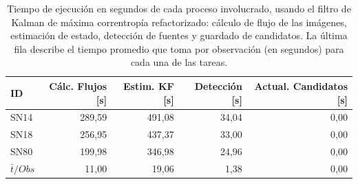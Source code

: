 \begin{table}[h!]
\centering
\caption{Tiempo de ejecuci\'on en segundos de cada proceso involucrado, usando el filtro de Kalman de m\'axima correntrop\'ia refactorizado: c\'alculo de flujo de las im\'agenes, estimaci\'on de estado, detecci\'on de fuentes y guardado de candidatos. La \'ultima fila describe el tiempo promedio que toma por observaci\'on (en segundos) para cada una de las tareas.}
\begin{tabular}{|l|r|r|r|r|}
\hline
\textbf{ID} & \textbf{C\'alc. Flujos [s]} & \textbf{Estim. KF [s]} &  \textbf{Detecci\'on [s]}  & \textbf{Actual. Candidatos [s]}\\ \hline \hline
SN14        & 289,59            & 491,08        &  34,04 & 0,00 \\ \hline
SN18            & 256,95             & 437,37         &  33,00  & 0,00\\ \hline
SN80            & 199,98             & 346,98         &   24,96 & 0,00 \\ \hline \hline
$\bar{t}/Obs$ & 11,00 &  19,06 & 1,38 & 0,00\\\hline 
\end{tabular}
\label{tab:t9}
\end{table}

